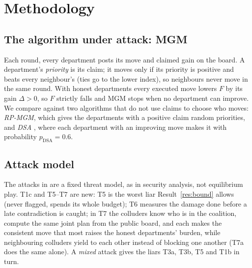 \documentclass{article}
\theoremstyle{definition}
\newcommand{\1}{\mathbf{1}}
\begin{document}
\section{Methodology}
\label{sec:method}
\subsection{The algorithm under attack: MGM}
Each round, every department posts its move and claimed gain on the board. A department's \emph{priority} is its claim; it moves only if its priority is positive and beats every neighbour's (ties go to the lower index), so neighbours never move in the same round. With honest departments every executed move lowers $F$ by its gain $\Delta>0$, so $F$ strictly falls and MGM stops when no department can improve. We compare against two algorithms that do not use claims to choose who moves: \emph{RP-MGM}, which gives the departments with a positive claim random priorities, and \emph{DSA} \citep{zhang2005}, where each department with an improving move makes it with probability $p_{\text{DSA}}=0.6$.

\subsection{Attack model}
The attacks in  are a fixed threat model, as in security analysis, not equilibrium play. T1c and T5--T7 are new: T5 is the worst liar Result~\ref{res:bound} allows (never flagged, spends its whole budget); T6 measures the damage done before a late contradiction is caught; in T7 the colluders know who is in the coalition, compute the same joint plan from the public board, and each makes the consistent move that most raises the honest departments' burden, while neighbouring colluders yield to each other instead of blocking one another (T7a does the same alone). A \emph{mixed} attack gives the liars T3a, T3b, T5 and T1b in turn.
\end{document}
